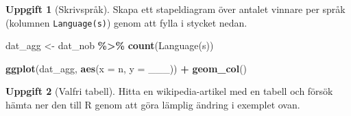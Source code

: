 \documentclass[
]{book}
\newenvironment{Shaded}{\begin{snugshade}}{\end{snugshade}}
\newcommand{\AttributeTok}[1]{\textcolor[rgb]{0.13,0.29,0.53}{#1}}
\newcommand{\FunctionTok}[1]{\textcolor[rgb]{0.13,0.29,0.53}{\textbf{#1}}}
\newcommand{\NormalTok}[1]{#1}
\newcommand{\OtherTok}[1]{\textcolor[rgb]{0.56,0.35,0.01}{#1}}
\newcommand{\SpecialCharTok}[1]{\textcolor[rgb]{0.81,0.36,0.00}{\textbf{#1}}}
\newcommand{\StringTok}[1]{\textcolor[rgb]{0.31,0.60,0.02}{#1}}
\theoremstyle{definition}
\theoremstyle{definition}
\theoremstyle{definition}
\newtheorem{exercise}{Uppgift}[chapter]
\theoremstyle{definition}
\theoremstyle{remark}
\begin{document}
\begin{exercise}[Skrivspråk]

Skapa ett stapeldiagram över antalet vinnare per språk (kolumnen \texttt{Language(s)}) genom att fylla i stycket nedan.

\begin{Shaded}
\begin{Highlighting}[]
\NormalTok{dat\_agg }\OtherTok{\textless{}{-}}\NormalTok{ dat\_nob }\SpecialCharTok{\%\textgreater{}\%} \FunctionTok{count}\NormalTok{(}\StringTok{\textasciigrave{}}\AttributeTok{Language(s)}\StringTok{\textasciigrave{}}\NormalTok{)}

\FunctionTok{ggplot}\NormalTok{(dat\_agg, }\FunctionTok{aes}\NormalTok{(}\AttributeTok{x =}\NormalTok{ n, }\AttributeTok{y =}\NormalTok{ \_\_\_)) }\SpecialCharTok{+}
  \FunctionTok{geom\_col}\NormalTok{()}
\end{Highlighting}
\end{Shaded}

\end{exercise}

\begin{exercise}[Valfri tabell]
Hitta en wikipedia-artikel med en tabell och försök hämta ner den till R genom att göra lämplig ändring i exemplet ovan.
\end{exercise}
\end{document}
